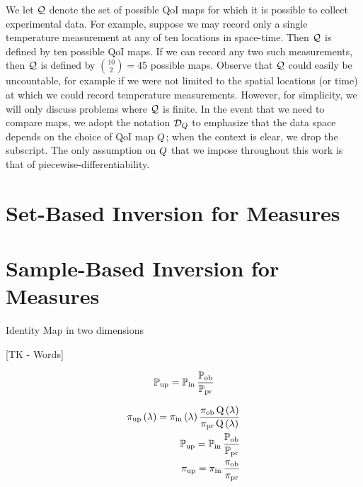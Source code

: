 We let $\mathcal{Q}$ denote the set of possible QoI maps for which it is possible to collect experimental data.
For example, suppose we may record only a single temperature measurement at any of ten locations in space-time.
Then $\mathcal{Q}$ is defined by ten possible QoI maps.
If we can record any two such measurements, then $\mathcal{Q}$ is defined by $\binom{10}{2} = 45$ possible maps.
Observe that $\mathcal{Q}$ could easily be uncountable, for example if we were not limited to the spatial locations (or time) at which we could record temperature measurements.
However, for simplicity, we will only discuss problems where $\mathcal{Q}$ is finite.
In the event that we need to compare maps, we adopt the notation $\mathcal{D}_{Q}$ to emphasize that the data space depends on the choice of QoI map $Q$; when the context is clear, we drop the subscript.
The only assumption on $Q$ that we impose throughout this work is that of piecewise-differentiability.


\section{Set-Based Inversion for Measures}\label{sec:ch02-set}






\pagebreak
\section{Sample-Based Inversion for Measures}\label{sec:ch02-sample}




Identity Map in two dimensions


[TK - Words]

\begin{equation}
\operatorname*{\mathbb{P}_{up}} = \operatorname*{\mathbb{P}_{in}} \frac{\operatorname*{\mathbb{P}_{ob}}}{\operatorname*{\mathbb{P}_{pr}}}
\end{equation}

\begin{equation}
\begin{split}
\operatorname*{\operatorname*{\pi_{up}}\left ( \lambda \right ) = \operatorname*{\pi_{in}}\left ( \lambda \right ) \frac{\operatorname*{\pi_{ob}}Q\left ( \lambda \right )}{\operatorname*{\pi_{pr}}Q\left ( \lambda \right )}}\\
\operatorname*{\operatorname*{\mathbb{P}_{up}} = \operatorname*{\mathbb{P}_{in}} \frac{\operatorname*{\mathbb{P}_{ob}}}{\operatorname*{\mathbb{P}_{pr}}}}\\
\operatorname*{\operatorname*{\pi_{up}} = \operatorname*{\pi_{in}} \frac{\operatorname*{\pi_{ob}}}{\operatorname*{\pi_{pr}}}}
\end{split}
\end{equation}

